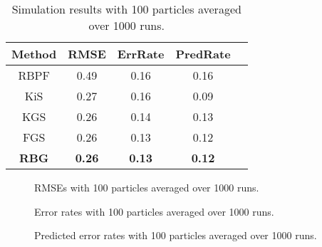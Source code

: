 \documentclass[twocolumn]{autart}    %
\begin{document}
%
\begin{table}[htb!]
\begin{center}
\begin{tabular}{|c|c|c|c|c|}
\hline
Method & RMSE              & ErrRate       &   PredRate \\
\hline
\hline
RBPF   & 0.49 & 0.16 & 0.16 \\ \hline
KiS    & 0.27 & 0.16 & 0.09 \\ \hline
KGS    & 0.26 & 0.14 & 0.13 \\ \hline
FGS    & 0.26 & 0.13 & 0.12 \\ \hline
{\bf RBG} & {\bf 0.26} & {\bf 0.13} & {\bf 0.12} \\ \hline
\end{tabular}
\end{center}
\caption{Simulation results with 100 particles averaged over 1000 runs. }
\label{tbl:res100}
\end{table}

\begin{figure}[htb!]
\begin{center}
\end{center}
\caption{RMSEs with 100 particles averaged over 1000 runs.}
\label{fig:100_rmse}
\end{figure}

\begin{figure}[htb!]
\begin{center}
\end{center}
\caption{Error rates with 100 particles averaged over 1000 runs.}
\label{fig:100_err}
\end{figure}

\begin{figure}[htb!]
\begin{center}
\end{center}
\caption{Predicted error rates with 100 particles averaged over 1000
  runs.}
\label{fig:100_errp}
\end{figure}
\end{document}
